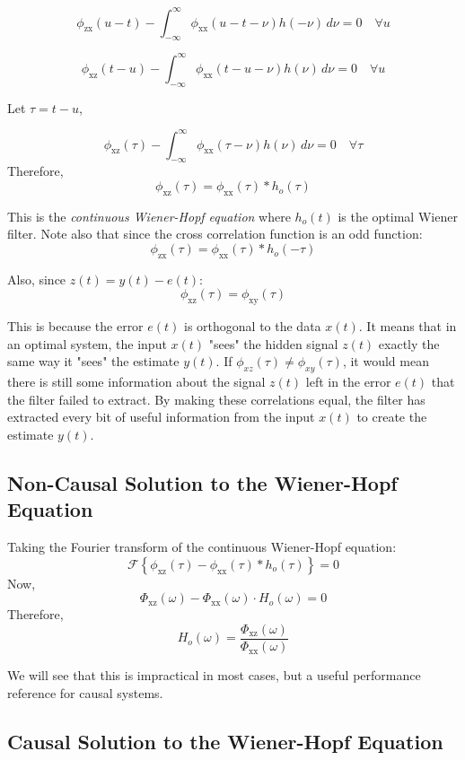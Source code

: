 \documentclass[12pt]{book}
\theoremstyle{definition}
\begin{document}
\[
\phi_\mathrm{zx}(u-t) - \int_{-\infty}^\infty \phi_\mathrm{xx}(u-t-\nu)h(-\nu)\, d \nu = 0 \quad \forall u
\]

\[
\phi_\mathrm{xz}(t-u) - \int_{-\infty}^\infty \phi_\mathrm{xx}(t-u-\nu)h(\nu)\, d \nu = 0 \quad \forall u
\]

Let \(\tau = t-u\),

\[
\phi_\mathrm{xz}(\tau) - \int_{-\infty}^\infty \phi_\mathrm{xx}(\tau-\nu)h(\nu)\, d \nu = 0 \quad \forall \tau
\]
Therefore,
\[
\boxed{\phi_\mathrm{xz}(\tau) = \phi_\mathrm{xx}(\tau)*h_o(\tau)}
\]

This is the \emph{continuous Wiener-Hopf equation} where $h_o(t)$ is the optimal Wiener filter. Note also that since the cross correlation function is an odd function:
\[
\phi_\mathrm{zx}(\tau) = \phi_\mathrm{xx}(\tau)*h_o(-\tau)
\]

Also, since \(z(t) = y(t) - e(t)\):
\[
\phi_\mathrm{xz}(\tau) = \phi_\mathrm{xy}(\tau)
\]

This is because the error \(e(t)\) is orthogonal to the data \(x(t)\). It means that in an optimal system, the input $x(t)$ "sees" the hidden signal $z(t)$ exactly the same way it "sees" the estimate $y(t)$. If $\phi_{xz}(\tau) \neq \phi_{xy}(\tau)$, it would mean there is still some information about the signal $z(t)$ left in the error $e(t)$ that the filter failed to extract. By making these correlations equal, the filter has extracted every bit of useful information from the input $x(t)$ to create the estimate $y(t)$. 

\subsection{Non-Causal Solution to the Wiener-Hopf Equation}

Taking the Fourier transform of the continuous Wiener-Hopf equation:
\[
\mathcal{F} \left \{ \phi_\mathrm{xz}(\tau) - 
 \phi_\mathrm{xx}(\tau)*h_o(\tau)\right \}=  0
\]
Now,
\[
\Phi_\mathrm{xz}(\omega) - \Phi_\mathrm{xx}(\omega)\cdot H_o(\omega)=  0
\]
Therefore, 
\[
\boxed{H_o(\omega) = \frac{\Phi_\mathrm{xz}(\omega)}{\Phi_\mathrm{xx}(\omega)}}
\]

We will see that this is impractical in most cases, but a useful performance reference for causal systems.

\subsection{Causal Solution to the Wiener-Hopf Equation}
\end{document}
